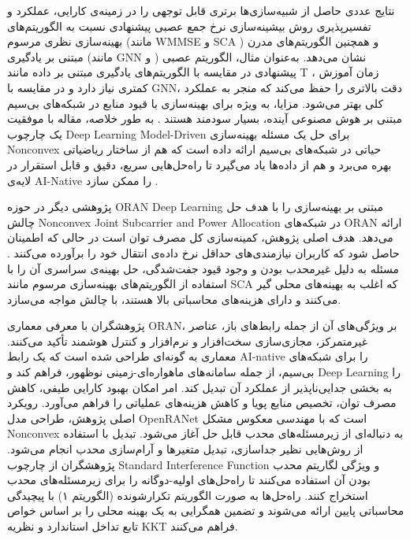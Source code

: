 نتایج عددی حاصل از شبیه‌سازی‌ها برتری قابل توجهی را در زمینه‌ی کارایی، عملکرد و تفسیرپذیری روش بیشینه‌سازی نرخ جمع عصبی پیشنهادی نسبت به الگوریتم‌های بهینه‌سازی نظری مرسوم (مانند 
\gls{WMMSE}
 و 
\gls{SCA}
 ) و همچنین الگوریتم‌های مدرن مبتنی بر یادگیری (مانند 
\gls{GNN}
  و 
  ) نشان می‌دهد. به‌عنوان مثال، الگوریتم عصبی پیشنهادی در مقایسه با الگوریتم‌های یادگیری مبتنی بر داده مانند T
،
   زمان آموزش کمتری نیاز دارد و در مقایسه با 
\gls{GNN}،
    دقت بالاتری را حفظ می‌کند که منجر به عملکرد کلی بهتر می‌شود.  مزایا، به ویژه برای بهینه‌سازی با قیود منابع در شبکه‌های بی‌سیم مبتنی بر هوش مصنوعی آینده، بسیار سودمند هستند .
به طور خلاصه،  مقاله با موفقیت یک چارچوب 
\gls{Deep Learning}
\gls{Model-Driven}
 برای حل یک مسئله بهینه‌سازی 
\gls{Nonconvex}
  حیاتی در شبکه‌های بی‌سیم ارائه داده است که هم از ساختار ریاضیاتی بهره می‌برد و هم از داده‌ها یاد می‌گیرد تا راه‌حل‌هایی سریع، دقیق و قابل استقرار در لایه‌ی AI-Native را ممکن سازد
\cite{NeuralSumRate}.

پژوهشی دیگر در حوزه 
\gls{ORAN}
\gls{Deep Learning}
 مبتنی بر بهینه‌سازی را با هدف حل چالش 
\gls{Nonconvex}
\gls{Joint Subcarrier and Power Allocation}
    در شبکه‌های ORAN ارائه می‌دهد. هدف اصلی  پژوهش، کمینه‌سازی کل مصرف توان است در حالی که اطمینان حاصل شود که کاربران نیازمندی‌های حداقل نرخ داده‌ی انتقال خود را برآورده می‌کنند .  مسئله به دلیل غیرمحدب بودن و وجود قیود جفت‌شدگی، حل بهینه‌ی سراسری آن را با استفاده از الگوریتم‌های بهینه‌سازی مرسوم مانند 
\gls{SCA}
     که اغلب به بهینه‌های محلی گیر می‌کنند و دارای هزینه‌های محاسباتی بالا هستند، با چالش مواجه می‌سازد.
     
پژوهشگران با معرفی معماری ORAN، بر ویژگی‌های آن از جمله رابط‌های باز، عناصر غیرمتمرکز، مجازی‌سازی سخت‌افزار و نرم‌افزار و کنترل هوشمند تأکید می‌کنند.  معماری به گونه‌ای طراحی شده است که یک رابط AI-native را برای شبکه‌های بی‌سیم، از جمله سامانه‌های ماهواره‌ای-زمینی نوظهور، فراهم کند و 
\gls{Deep Learning}
 را به بخشی جدایی‌ناپذیر از عملکرد آن تبدیل کند.  امر امکان بهبود کارایی طیفی، کاهش مصرف توان، تخصیص منابع پویا و کاهش هزینه‌های عملیاتی را فراهم می‌آورد.
رویکرد اصلی پژوهش، طراحی مدل OpenRANet است که با مهندسی معکوس مشکل 
\gls{Nonconvex}
 به دنباله‌ای از زیرمسئله‌های محدب قابل حل آغاز می‌شود.  تبدیل با استفاده از روش‌هایی نظیر جداسازی، تبدیل متغیرها و آرام‌سازی محدب انجام می‌شود. پژوهشگران از چارچوب 
\gls{Standard Interference Function}
 و ویژگی لگاریتم محدب بودن آن استفاده می‌کنند تا راه‌حل‌های اولیه-دوگانه را برای  زیرمسئله‌های محدب استخراج کنند. راه‌حل‌ها به صورت الگوریتم تکرارشونده (الگوریتم ۱) با پیچیدگی محاسباتی پایین ارائه می‌شوند و تضمین همگرایی به یک بهینه محلی را بر اساس خواص تابع تداخل استاندارد و نظریه 
\gls{KKT}
  فراهم می‌کنند.
  
